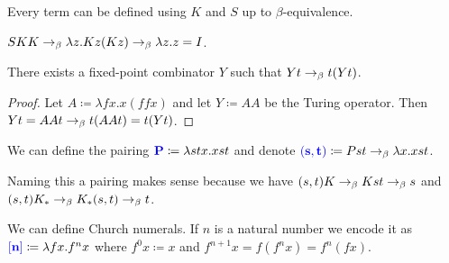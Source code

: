 \begin{rem}
    Every term can be defined using $K$ and $S$ up to $\beta$-equivalence.
\end{rem}

\begin{example}
    $SKK \to_{\beta} \lambda z. Kz(Kz) \to_{\beta} \lambda z.z = I$.
\end{example}

\begin{boxprop} \label{prop:fixpoi}
    There exists a \alert{fixed-point combinator} $Y$ such that $Y t \to_{\beta} t(Yt)$.
\end{boxprop}
\begin{proof}
    Let $A \coloneq \lambda fx. x(ffx)$ and let $Y \coloneq AA$ be the \alert{Turing operator}.
    Then $Yt = AAt \to_{\beta} t (AAt) = t(Yt)$.
\end{proof}

\begin{boxdefi}
    We can define the \alert{pairing} $\alert{P} \coloneq \lambda stx.xst$ and denote $\alert{(s, t)} \coloneq Pst \bered \lambda x. xst$.
\end{boxdefi}

\begin{rem}
    Naming this a pairing makes sense because we have $(s, t) K \to_{\beta} Kst \to_{\beta} s$ and $(s, t) K_* \to_{\beta} K_*(s, t) \to_{\beta} t$.
\end{rem}

\begin{boxdefi}
    We can define \alert{Church numerals}.
    If $n$ is a natural number we encode it as $\alert{[n]} \coloneq \lambda fx. f^n x$ where $f^0 x \coloneq x$ and $f^{n+1} x = f(f^nx) = f^n(fx)$.
\end{boxdefi}

